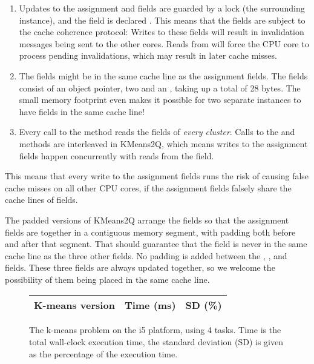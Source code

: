 \begin{enumerate}
	\item{Updates to the assignment and  fields
		are guarded by a lock (the surrounding  instance),
		and the  field is declared }. This
		means that the fields are subject to the cache coherence
		protocol: Writes to these fields will result in invalidation
		messages being sent to the other cores. Reads from 
		will force the CPU core to process pending invalidations, which
		may result in later cache misses.
	\item {The  fields might be in the same cache line as the
		assignment fields. The fields consist of an object pointer, two
		 and an , taking up a total of 28
		bytes. The small memory footprint even makes it possible for
		two separate  instances to have fields in the same
		cache line!}
	\item {Every call to the  method reads the 
		fields of \textit{every cluster}. Calls to the 
		and  methods are interleaved in KMeans2Q, which
		means writes to the assignment fields happen concurrently with
		reads from the  field.}
\end{enumerate}

This means that every write to the assignment fields runs the risk of causing
false cache misses on all other CPU cores, if the assignment fields falsely
share the cache lines of  fields.

The padded versions of KMeans2Q arrange the fields so that the assignment fields
are together in a contiguous memory segment, with padding both before and after
that segment. That should guarantee that the  field is never in the
same cache line as the three other fields. No padding is added between the
, , and  fields. These three fields are always
updated together, so we welcome the possibility of them being placed in the
same cache line.

\begin{figure}[hbtp]
	\centering
	\begin{tabular}{l r r}
		\hline
		\hline
		K-means version & Time (ms) & SD (\%) \\
		\hline
		
		\hline
		\hline
	\end{tabular}
	\caption{The k-means problem on the i5 platform, using 4 tasks. Time is
	the total wall-clock execution time, the standard deviation (SD) is
	given as the percentage of the execution time.}
	\label{table:kmeans-i5}
\end{figure}

